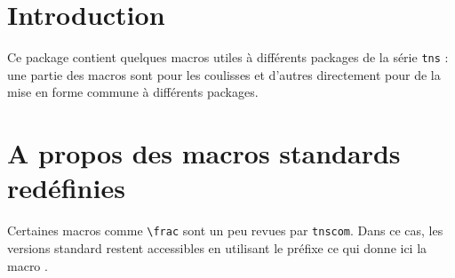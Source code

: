 \documentclass[12pt,a4paper]{article}
\begin{document}
\section{Introduction}

Ce package contient quelques macros utiles à différents packages de la série \verb+tns+ : une partie des macros sont pour les coulisses et d'autres directement pour de la mise en forme commune à différents packages.




\section{A propos des macros standards redéfinies}

Certaines macros comme \verb+\frac+ sont un peu revues par \verb+tnscom+.
Dans ce cas, les versions standard restent accessibles en utilisant le préfixe  ce qui donne ici la macro .
\end{document}
